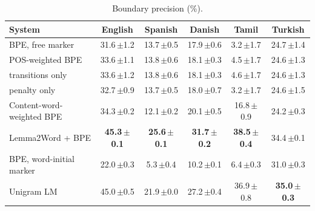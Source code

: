 \begin{table}[!ht]
\centering
\caption{Boundary precision (\%).}
\label{tab:precision}
\small
\setlength{\tabcolsep}{4pt}
\begin{tabular}{lccccc}
\toprule
System & English & Spanish & Danish & Tamil & Turkish \\
\midrule
BPE, free marker & 31.6\,{\scriptsize$\pm$1.2} & 13.7\,{\scriptsize$\pm$0.5} & 17.9\,{\scriptsize$\pm$0.6} & 3.2\,{\scriptsize$\pm$1.7} & 24.7\,{\scriptsize$\pm$1.4} \\
POS-weighted BPE & 33.6\,{\scriptsize$\pm$1.1} & 13.8\,{\scriptsize$\pm$0.6} & 18.1\,{\scriptsize$\pm$0.3} & 4.5\,{\scriptsize$\pm$1.7} & 24.6\,{\scriptsize$\pm$1.3} \\
\quad transitions only & 33.6\,{\scriptsize$\pm$1.2} & 13.8\,{\scriptsize$\pm$0.6} & 18.1\,{\scriptsize$\pm$0.3} & 4.6\,{\scriptsize$\pm$1.7} & 24.6\,{\scriptsize$\pm$1.3} \\
\quad penalty only & 32.7\,{\scriptsize$\pm$0.9} & 13.7\,{\scriptsize$\pm$0.5} & 18.0\,{\scriptsize$\pm$0.7} & 3.2\,{\scriptsize$\pm$1.7} & 24.6\,{\scriptsize$\pm$1.5} \\
\addlinespace[2pt]
Content-word-weighted BPE & 34.3\,{\scriptsize$\pm$0.2} & 12.1\,{\scriptsize$\pm$0.2} & 20.1\,{\scriptsize$\pm$0.5} & 16.8\,{\scriptsize$\pm$0.9} & 24.2\,{\scriptsize$\pm$0.3} \\
Lemma2Word + BPE & \textbf{45.3\,{\scriptsize$\pm$0.1}} & \textbf{25.6\,{\scriptsize$\pm$0.1}} & \textbf{31.7\,{\scriptsize$\pm$0.2}} & \textbf{38.5\,{\scriptsize$\pm$0.4}} & 34.4\,{\scriptsize$\pm$0.1} \\
BPE, word-initial marker & 22.0\,{\scriptsize$\pm$0.3} & 5.3\,{\scriptsize$\pm$0.4} & 10.2\,{\scriptsize$\pm$0.1} & 6.4\,{\scriptsize$\pm$0.3} & 31.0\,{\scriptsize$\pm$0.3} \\
Unigram LM & 45.0\,{\scriptsize$\pm$0.5} & 21.9\,{\scriptsize$\pm$0.0} & 27.2\,{\scriptsize$\pm$0.4} & 36.9\,{\scriptsize$\pm$0.8} & \textbf{35.0\,{\scriptsize$\pm$0.3}} \\
\bottomrule
\end{tabular}
\end{table}
